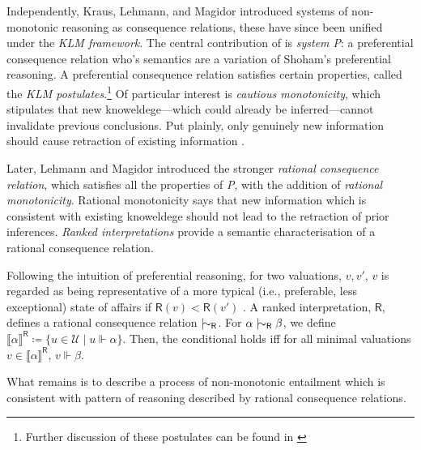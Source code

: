 Independently, Kraus, Lehmann, and Magidor introduced systems of non-monotonic reasoning as consequence relations, these have since been unified under the \textit{KLM framework}. The central contribution of \cite{kraus1990nonmonotonic} is \textit{system P}: a preferential consequence relation who's semantics are a variation of Shoham's preferential reasoning. A preferential consequence relation satisfies certain properties, called the \textit{KLM postulates}.\footnote{Further discussion of these postulates can be found in \cite{kraus1990nonmonotonic}} Of particular interest is \textit{cautious monotonicity}, which stipulates that new knoweldege—which could already be inferred—cannot invalidate previous conclusions. Put plainly, only genuinely new information should cause retraction of existing information \cite{kraus1990nonmonotonic,kaliski2020overview}.

Later, Lehmann and Magidor \cite{lehmann1994what} introduced the stronger  \textit{rational consequence relation}, which  satisfies all the properties of \textit{P}, with the addition of \textit{rational monotonicity}. Rational monotonicity says that new information which is consistent with existing knoweldege should not lead to the retraction of prior inferences. \textit{Ranked interpretations} provide a semantic characterisation of a rational consequence relation.


Following the intuition of preferential reasoning, for two valuations, $v,v'$, $v$ is regarded as being representative of a more typical (i.e., preferable, less exceptional) state of affairs if $\mathsf{R}(v) < \mathsf{R}(v')$ \cite{lehmann1994what}. A ranked interpretation, $\mathsf{R}$, defines a rational consequence relation $\twiddle_\mathsf{R}$. For $\alpha \twiddle_\mathsf{R} \beta$, we define $\llbracket \alpha \rrbracket^\mathsf{R} \coloneq \{u \in \mathcal{U} \mid u \Vdash \alpha\}$. Then, the conditional holds iff for all minimal valuations $v \in \llbracket \alpha \rrbracket^\mathsf{R}$, $v \Vdash \beta$.

What remains is to describe a process of non-monotonic entailment which is consistent with pattern of reasoning described by rational consequence relations.


